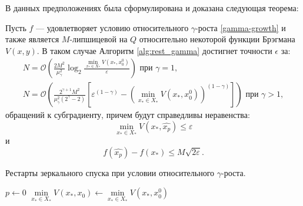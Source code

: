 В данных предположениях была сформулирована и доказана следующая теорема:
\begin{theorem} \label{simple_restart}
    Пусть $f$ --- удовлетворяет условию относительного $\gamma$-роста \eqref{gamma-growth} и также является $M$-липшицевой на $Q$ относительно некоторой функции Брэгмана $V(x, y)$. В таком случае Алгоритм \ref{alg:rest_gamma} достигнет точности $\epsilon$ за:
    \begin{equation}
    \begin{aligned}
       N =\mathcal{O}\left(\frac{2 M^2}{\mu_{\gamma}^2} \log_2{\frac{\min\limits_{x_* \in X_*}{V(x_*, x_0^0)}}{\varepsilon}}\right) \text{ при } \gamma = 1, \\
       N = \mathcal{O}\left(\frac{2^{\gamma + 1} M^2}{\mu_{\gamma}^2 (2^{\gamma} - 2)} \left[\varepsilon^{(1 - \gamma)} - \left(\min\limits_{x_* \in X_*}{V(x_*, x_0^0)}\right)^{(1 - \gamma)}\right]\right) \text{ при } \gamma > 1,
    \end{aligned}
    \end{equation}
    обращений к субградиенту, причем будут справедливы неравенства:
    \begin{equation}
        \min_{x_* \in X_*}{V(x_*, \widehat{x_p})} \leq \varepsilon
    \end{equation}
    и
    \begin{equation}
        f(\widehat{x_p}) - f(x_*) \leq M \sqrt{2 \varepsilon}.  
    \end{equation}
\end{theorem}

\begin{algorithm}[htp]
    \caption{Рестарты зеркального спуска при условии относительного $\gamma$-роста.}
    \label{alg:rest_gamma}
    $p \gets 0$\;
    $\min\limits_{x_* \in X_*}{V(x_*, x_0)} \gets \min\limits_{x_* \in X_*}{V(x_*,x_0^0)}$\;
\end{algorithm}

